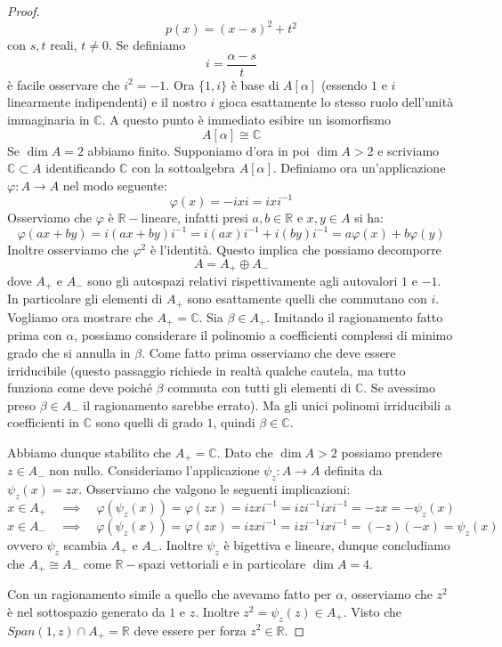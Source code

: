 \documentclass[11pt]{article}
\theoremstyle{plain}
\theoremstyle{definition}
\theoremstyle{remark}
\newcommand{\C}{\mathbb{C}}
\newcommand{\R}{\mathbb{R}}
\begin{document}
\begin{proof}
\[ p(x) = (x-s)^2+t^2\]
con $s,t$ reali, $t\neq 0$. Se definiamo
\[i = \frac{\alpha-s}{t}\]
è facile osservare che $i^2 = -1$. Ora $\{1, i\}$ è base di $A[\alpha]$ (essendo $1$ e $i$ linearmente indipendenti) e il nostro $i$
gioca esattamente lo stesso ruolo dell'unità immaginaria in $\C$. A questo punto è immediato esibire un isomorfismo
\[ A[\alpha] \cong \C \]
Se $\dim A =2 $ abbiamo finito. Supponiamo d'ora in poi $\dim A > 2$ e scriviamo $\C\subset A$ identificando $\C$ con la
sottoalgebra $A[\alpha]$. Definiamo ora un'applicazione $\varphi:A\to A$ nel modo seguente:
\[ \varphi(x) = -ixi = ixi^{-1} \]
Osserviamo che $\varphi$ è $\R-$lineare, infatti presi $a,b\in\R$ e $x,y\in A$ si ha:
\[ \varphi(ax+by) = i(ax+by)i^{-1} = i(ax)i^{-1} +i(by)i^{-1} = a\varphi(x) + b\varphi(y)\]
Inoltre osserviamo che $\varphi^2$ è l'identità. Questo implica che possiamo decomporre
\[ A = A_+ \oplus A_-\] dove $A_+$ e $A_-$ sono gli autospazi relativi rispettivamente agli autovalori $1$ e $-1$.
In particolare gli elementi di $A_+$ sono esattamente quelli che commutano con $i$.
Vogliamo ora mostrare che $A_+ = \C$.
Sia $\beta\in A_+$. Imitando il ragionamento fatto prima con $\alpha$, possiamo considerare il polinomio a coefficienti complessi di minimo grado
che si annulla in $\beta$. Come fatto prima osserviamo che deve essere irriducibile (questo passaggio richiede in realtà qualche cautela,
ma tutto funziona come deve poiché $\beta$ commuta con tutti gli elementi di $\C$. Se avessimo preso $\beta\in A_-$ il ragionamento sarebbe errato).
Ma gli unici polinomi irriducibili a coefficienti in $\C$ sono quelli di grado $1$, quindi $\beta\in\C$.

Abbiamo dunque stabilito che $A_+ = \C$. Dato che $\dim A > 2$ possiamo prendere $z\in A_-$ non nullo.
Consideriamo l'applicazione $\psi_z:A\to A$ definita da $\psi_z(x) = zx$.
Osserviamo che valgono le seguenti implicazioni:
\[ x\in A_+ \quad\implies\quad \varphi(\psi_z(x)) = \varphi(zx) = izxi^{-1} = izi^{-1}ixi^{-1} = -zx = -\psi_z(x)\]
\[ x\in A_- \quad\implies\quad \varphi(\psi_z(x)) = \varphi(zx) = izxi^{-1} = izi^{-1}ixi^{-1} = (-z)(-x) = \psi_z(x)\]
ovvero $\psi_z$ scambia $A_+$ e $A_-$. Inoltre $\psi_z$ è bigettiva e lineare, dunque concludiamo che $A_+\cong A_-$ come $\R-$spazi vettoriali e in particolare $\dim A = 4$.

Con un ragionamento simile a quello che avevamo fatto per $\alpha$, osserviamo che $z^2$ è nel sottospazio generato da $1$ e $z$. Inoltre $z^2=\psi_z(z)\in A_+$.
Visto che $Span(1,z) \cap A_+ = \R$ deve essere per forza $z^2\in\R$.


\end{proof}
\end{document}
